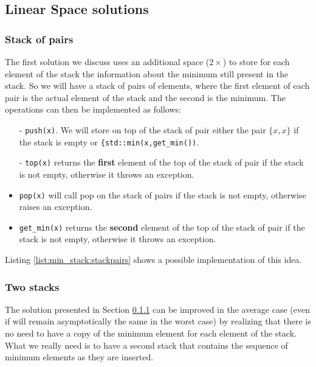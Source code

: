 \subsection{Linear Space solutions}
\label{min_stack:sec:double_stack}

\subsubsection{Stack of pairs}
\label{min_stack:sec:stackpairs}
The first solution we discuss uses an additional space ($2\times$) to store  for each element of the stack the information about the minimum still present in the stack. So we will have a stack of pairs of elements, where the first element of each pair is the actual element of the stack and the second is the minimum. The operations can then be implemented as follows:

\begin{itemize}
	\item[-]\lstinline[columns=fixed]{push(x)}. We will store on top of the stack of pair either the pair $\{x,x\}$ if the stack is empty or \lstinline[columns=fixed]{{std::min(x,get_min())}.
	\item[-]\lstinline[columns=fixed]{top(x)}  returns the \textbf{first} element of the top of the stack of pair if the stack is not empty, otherwise it throws an exception.
	\item[-]\lstinline[columns=fixed]{pop(x)} will call pop on the stack of pairs if the stack is not empty, otherwise raises an exception.
	\item[-]\lstinline[columns=fixed]{get_min(x)}  returns the \textbf{second} element of the top of the stack of pair if the stack is not empty, otherwise it throws an exception.
\end{itemize}

Listing \ref{list:min_stack:stackpairs} shows a possible implementation of this idea.


\subsubsection{Two stacks}
The solution presented in Section \ref{min_stack:sec:stackpairs} can be improved in the average case (even if will remain asymptotically the same in the worst case) by realizing that there is no need to have a copy of the minimum element for each element of the stack. What we really need is to have a second stack that contains the sequence of minimum elements as they are inserted. 

